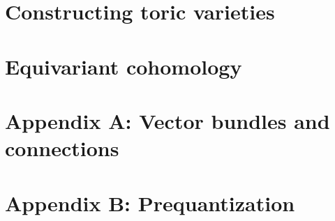 \documentclass{amsart}
\numberwithin{equation}{section}
\theoremstyle{plain} %
\theoremstyle{definition}
\theoremstyle{remark}
\begin{document}
\section{Constructing toric varieties}

\section{Equivariant cohomology}


\section{Appendix A: Vector bundles and connections}


\section{Appendix B: Prequantization}


{}

\end{document}

